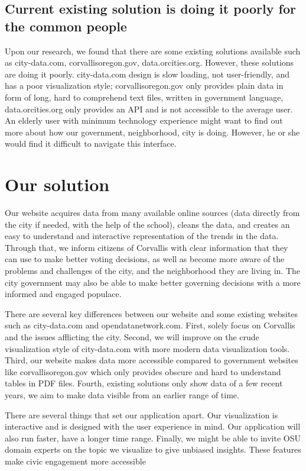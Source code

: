 \documentclass{article}
\begin{document}
\subsection{Current existing solution is doing it poorly for the common people}

Upon our research, we found that there are some existing solutions available such as city-data.com, corvallisoregon.gov, data.orcities.org. However, these solutions are doing it poorly. city-data.com design is slow loading, not user-friendly, and has a poor visualization style; corvallisoregon.gov only provides plain data in form of long, hard to comprehend text files, written in government language, data.orcities.org only provides an API and is not accessible to the average user. An elderly user with minimum technology experience might want to find out more about how our government, neighborhood, city is doing. However, he or she would find it difficult to navigate this interface.

\section{Our solution}

Our website acquires data from many available online sources (data directly from the city if needed, with the help of the school), cleans the data, and creates an easy to understand and interactive representation of the trends in the data. Through that, we inform citizens of Corvallis with clear information that they can use to make better voting decisions, as well as become more aware of the problems and challenges of the city, and the neighborhood they are living in. The city government may also be able to make better governing decisions with a more informed and engaged populace.

There are several key differences between our website and some existing websites such as city-data.com and opendatanetwork.com. First, solely focus on Corvallis and the issues afflicting the city. Second, we will improve on the crude visualization style of city-data.com with more modern data visualization tools. Third, our website makes data more accessible compared to government websites like corvallisoregon.gov which only provides obscure and hard to understand tables in PDF files. Fourth, existing solutions only show data of a few recent years, we aim to make data visible from an earlier range of time.

There are several things that set our application apart. Our visualization is interactive and is designed with the user experience in mind. Our application will also run faster, have a longer time range. Finally, we might be able to invite OSU domain experts on the topic we visualize to give unbiased insights. These features make civic engagement more accessible
\end{document}
